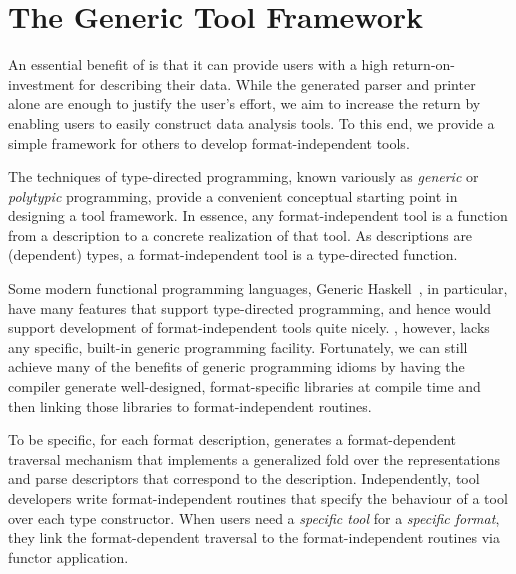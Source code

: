 \section{The Generic Tool Framework}
\label{sec:gen-tool}

An essential benefit of \padsml{} is that it can provide users with a
high return-on-investment for describing their data. While the
generated parser and printer alone are enough to justify the user's
effort, we aim to increase the return by enabling users to easily
construct data analysis tools.
To this end, we provide a simple framework for others to develop 
format-independent tools.

The techniques of type-directed programming, known variously as
\textit{generic} or \textit{polytypic} programming, provide a
convenient conceptual starting point in designing a tool framework.
In essence, any format-independent tool is a function from a description to 
a concrete realization of that tool. 
As \padsml{} descriptions are (dependent) types, a 
format-independent tool is a type-directed function.


Some modern functional programming languages,
Generic Haskell~\cite{hinze+:generic-haskell}, in particular,
have many features that support type-directed programming, and
hence would support development of format-independent tools quite nicely. 
\ocaml{}, however, lacks any specific, built-in generic programming facility.
Fortunately, we can still achieve many of the benefits of generic 
programming idioms by having the \padsml{} compiler generate
well-designed, format-specific libraries at compile time
and then linking those libraries to format-independent routines.

To be specific, for each format description, \padsml{} generates a
format-dependent traversal mechanism that implements a generalized
fold over the representations and parse descriptors that correspond to
the description. Independently, tool developers write format-independent
routines that specify the behaviour of a tool over each
\padsml{} type constructor. When users need a {\em specific tool} for a
{\em specific format}, they link the format-dependent 
traversal to the format-independent routines via 
functor application.

